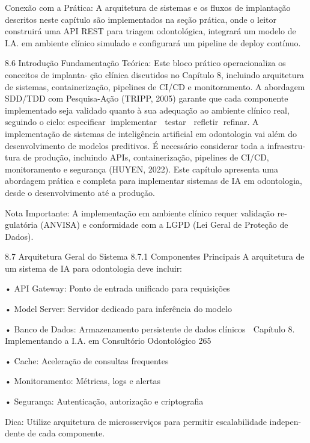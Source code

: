 Conexão com a Prática: A arquitetura de sistemas e os fluxos de implantação descritos
neste capítulo são implementados na seção prática, onde o leitor construirá uma API
REST para triagem odontológica, integrará um modelo de I.A. em ambiente clínico
simulado e configurará um pipeline de deploy contínuo.


8.6     Introdução
Fundamentação Teórica: Este bloco prático operacionaliza os conceitos de implanta-
ção clínica discutidos no Capítulo 8, incluindo arquitetura de sistemas, containerização,
pipelines de CI/CD e monitoramento. A abordagem SDD/TDD com Pesquisa-Ação
(TRIPP, 2005) garante que cada componente implementado seja validado quanto à
sua adequação ao ambiente clínico real, seguindo o ciclo: especificar      implementar
  testar   refletir refinar.
        A implementação de sistemas de inteligência artificial em odontologia vai além
do desenvolvimento de modelos preditivos. É necessário considerar toda a infraestru-
tura de produção, incluindo APIs, containerização, pipelines de CI/CD, monitoramento
e segurança (HUYEN, 2022).
       Este capítulo apresenta uma abordagem prática e completa para implementar
sistemas de IA em odontologia, desde o desenvolvimento até a produção.

    Nota Importante: A implementação em ambiente clínico requer validação re-
    gulatória (ANVISA) e conformidade com a LGPD (Lei Geral de Proteção de
    Dados).


8.7     Arquitetura Geral do Sistema
8.7.1    Componentes Principais
A arquitetura de um sistema de IA para odontologia deve incluir:

    • API Gateway: Ponto de entrada unificado para requisições

    • Model Server: Servidor dedicado para inferência do modelo

    • Banco de Dados: Armazenamento persistente de dados clínicos
     Capítulo 8. Implementando a I.A. em Consultório Odontológico                        265


         • Cache: Aceleração de consultas frequentes

         • Monitoramento: Métricas, logs e alertas

         • Segurança: Autenticação, autorização e criptografia


         Dica: Utilize arquitetura de microsserviços para permitir escalabilidade indepen-
         dente de cada componente.


